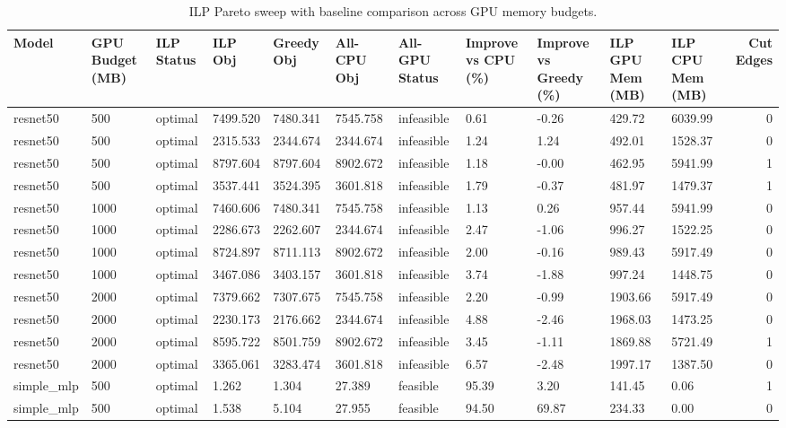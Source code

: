 \begin{table}[t]
\centering
\caption{ILP Pareto sweep with baseline comparison across GPU memory budgets.}
\label{tab:ilp-budget-sweep}
\begin{tabular}{lllllllllllr}
\toprule
Model & GPU Budget (MB) & ILP Status & ILP Obj & Greedy Obj & All-CPU Obj & All-GPU Status & Improve vs CPU (\%) & Improve vs Greedy (\%) & ILP GPU Mem (MB) & ILP CPU Mem (MB) & Cut Edges \\
\midrule
resnet50 & 500 & optimal & 7499.520 & 7480.341 & 7545.758 & infeasible & 0.61 & -0.26 & 429.72 & 6039.99 & 0 \\
resnet50 & 500 & optimal & 2315.533 & 2344.674 & 2344.674 & infeasible & 1.24 & 1.24 & 492.01 & 1528.37 & 0 \\
resnet50 & 500 & optimal & 8797.604 & 8797.604 & 8902.672 & infeasible & 1.18 & -0.00 & 462.95 & 5941.99 & 1 \\
resnet50 & 500 & optimal & 3537.441 & 3524.395 & 3601.818 & infeasible & 1.79 & -0.37 & 481.97 & 1479.37 & 1 \\
resnet50 & 1000 & optimal & 7460.606 & 7480.341 & 7545.758 & infeasible & 1.13 & 0.26 & 957.44 & 5941.99 & 0 \\
resnet50 & 1000 & optimal & 2286.673 & 2262.607 & 2344.674 & infeasible & 2.47 & -1.06 & 996.27 & 1522.25 & 0 \\
resnet50 & 1000 & optimal & 8724.897 & 8711.113 & 8902.672 & infeasible & 2.00 & -0.16 & 989.43 & 5917.49 & 0 \\
resnet50 & 1000 & optimal & 3467.086 & 3403.157 & 3601.818 & infeasible & 3.74 & -1.88 & 997.24 & 1448.75 & 0 \\
resnet50 & 2000 & optimal & 7379.662 & 7307.675 & 7545.758 & infeasible & 2.20 & -0.99 & 1903.66 & 5917.49 & 0 \\
resnet50 & 2000 & optimal & 2230.173 & 2176.662 & 2344.674 & infeasible & 4.88 & -2.46 & 1968.03 & 1473.25 & 0 \\
resnet50 & 2000 & optimal & 8595.722 & 8501.759 & 8902.672 & infeasible & 3.45 & -1.11 & 1869.88 & 5721.49 & 1 \\
resnet50 & 2000 & optimal & 3365.061 & 3283.474 & 3601.818 & infeasible & 6.57 & -2.48 & 1997.17 & 1387.50 & 0 \\
simple_mlp & 500 & optimal & 1.262 & 1.304 & 27.389 & feasible & 95.39 & 3.20 & 141.45 & 0.06 & 1 \\
simple_mlp & 500 & optimal & 1.538 & 5.104 & 27.955 & feasible & 94.50 & 69.87 & 234.33 & 0.00 & 0 \\

\end{tabular}
\end{table}
